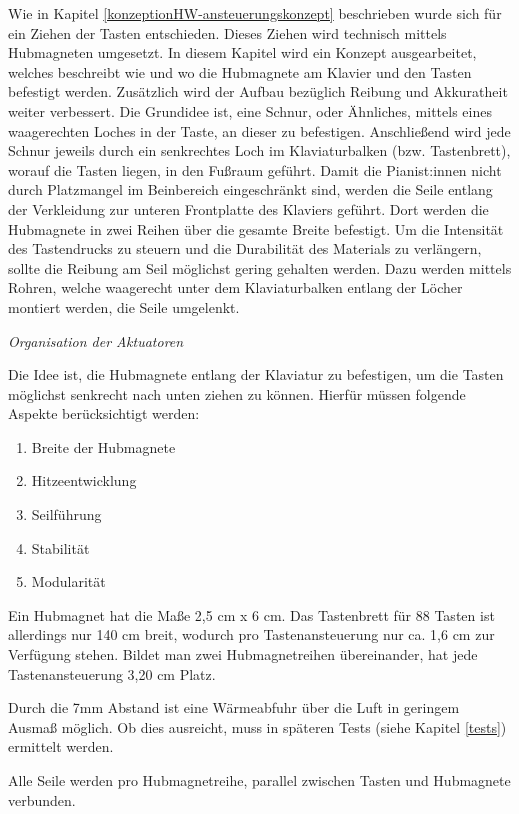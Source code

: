 \begin{enumerate}
Wie in Kapitel \ref{konzeptionHW-ansteuerungskonzept} beschrieben wurde sich für ein Ziehen der Tasten entschieden.
Dieses Ziehen wird technisch mittels Hubmagneten umgesetzt.
In diesem Kapitel wird ein Konzept ausgearbeitet, welches beschreibt wie und wo die Hubmagnete am Klavier und den Tasten befestigt werden.
Zusätzlich wird der Aufbau bezüglich Reibung und Akkuratheit weiter verbessert.
\newline
Die Grundidee ist, eine Schnur, oder Ähnliches, mittels eines waagerechten Loches in der Taste, an dieser zu befestigen.
Anschließend wird jede Schnur jeweils durch ein senkrechtes Loch im Klaviaturbalken (bzw. Tastenbrett), worauf die Tasten liegen, in den Fußraum geführt.
Damit die Pianist:innen nicht durch Platzmangel im Beinbereich eingeschränkt sind,
werden die Seile entlang der Verkleidung zur unteren Frontplatte des Klaviers geführt.
Dort werden die Hubmagnete in zwei Reihen über die gesamte Breite befestigt.
Um die Intensität des Tastendrucks zu steuern und die Durabilität des Materials zu verlängern, sollte die Reibung am Seil möglichst gering gehalten werden.
Dazu werden mittels Rohren, welche waagerecht unter dem Klaviaturbalken entlang der Löcher montiert werden, die Seile umgelenkt.

\textit{Organisation der Aktuatoren}

Die Idee ist, die Hubmagnete entlang der Klaviatur zu befestigen, um die Tasten möglichst senkrecht nach unten ziehen zu können.
Hierfür müssen folgende Aspekte berücksichtigt werden:

\begin{enumerate}
	\item Breite der Hubmagnete
	\item Hitzeentwicklung
	\item Seilführung
	\item Stabilität
	\item Modularität
\end{enumerate}

Ein Hubmagnet hat die Maße 2,5 cm x 6 cm.
Das Tastenbrett für 88 Tasten ist allerdings nur 140 cm breit, wodurch pro Tastenansteuerung nur ca. 1,6 cm zur Verfügung stehen.
Bildet man zwei Hubmagnetreihen übereinander, hat jede Tastenansteuerung 3,20 cm Platz.

Durch die 7mm Abstand ist eine Wärmeabfuhr über die Luft in geringem Ausmaß möglich.
Ob dies ausreicht, muss in späteren Tests (siehe Kapitel \ref{tests}) ermittelt werden.

Alle Seile werden pro Hubmagnetreihe, parallel zwischen Tasten und Hubmagnete verbunden.


\end{enumerate}
